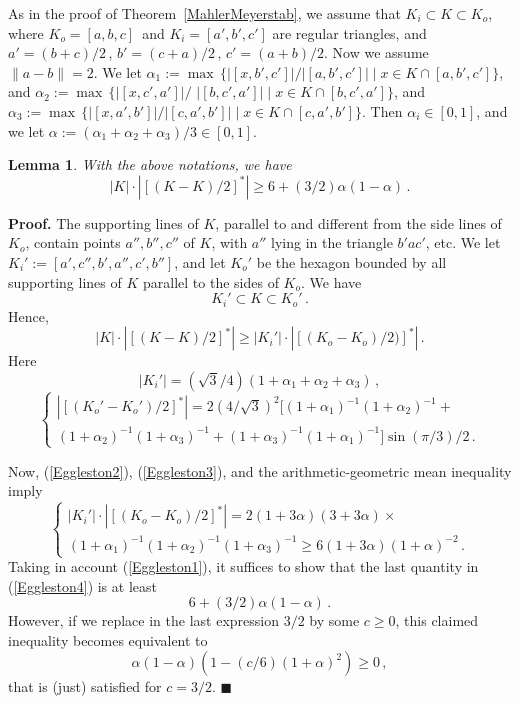 \documentclass[12pt]{article}
\newtheorem{Lem}[Thm]{Lemma}
\begin{document}
As in the proof of Theorem~\ref{MahlerMeyerstab}, we assume that $K_i \subset
K \subset K_o$, where $K_o=[a,b,c]\,$ and 
$K_i=[a',b',c']$ are regular triangles, and
$a'=(b+c)/2\,$, $b'=(c+a)/2\,$, $c'=(a+b)/2$. Now we assume $\| a-b \| =2$.
We let $\alpha _1:= \max \, \{ | [x,b',c']|/|[a,b',c'] | \mid x \in K \cap
[a,b',c'] \} $, and
$ \alpha _2:= \max \, \{ | [x,c',a']|/$
\newline
$|[b,c',a'] | \mid x \in K \cap
[b,c',a'] \} $, and
$\alpha _3:= \max \, \{ | [x,a',b']|/|[c,a',b'] | \mid x \in K \cap
[c,a',b'] \} $. 
Then $ \alpha _i \in [0,1]$, and we let $\alpha :=(\alpha _1+ \alpha _2+ \alpha
_3)/3 \in [0,1]$.


\begin{Lem}
\label{Egglestonlemma}
With the above notations, we have
$$
|K| \cdot | [ (K-K)/2 ] ^* | \ge 6 + (3/2) \alpha (1- \alpha ) \,.
$$
\end{Lem}

{\bf Proof.}
The supporting lines of
$K$, parallel to and different from the side lines of $K_o$, contain points
$a'',b'',c''$ of $K$, with $a''$ lying in the triangle $b'ac'$, etc.
We let $K_i':=[a',c'',b',a'',c',b'']$, and let
$K_o'$ be the hexagon bounded by all supporting lines of $K$ parallel to the
sides of $K_o$.
We have 
$$
K_i' \subset K \subset K_o'\,.
$$
Hence, 
\begin{equation}
\label{Eggleston1}
|K| \cdot | [(K-K)/2]^* | \ge | K_i'| \cdot | [(K_o-K_o)/2)]^* | \,. 
\end{equation}
Here 
\begin{equation}
\label{Eggleston2}
| K_i'|=({\sqrt{3}}/4) (1+ \alpha _1+ \alpha _2+ \alpha _3)\,, 
\end{equation}
\begin{equation}
\label{Eggleston3}
\begin{cases}
| [(K_o'-K_o')/2]^* | = 
2 ( 4/ \sqrt{3} ) ^2 [ (1+ \alpha _1)^{-1}(1+ \alpha _2)^{-1} + \\
(1+ \alpha _2)^{-1}(1+ \alpha _3)^{-1}+(1+\alpha _3)^{-1}(1+ \alpha _1)^{-1} 
] \sin (\pi /3)/2\,. 
\end{cases}
\end{equation}

Now, (\ref{Eggleston2}), (\ref{Eggleston3}), and 
the arithmetic-geometric mean inequality imply 
\begin{equation}
\label{Eggleston4}
\begin{cases}
| K_i'| \cdot | [(K_o-K_o)/2]^* | = 
2(1+3 \alpha )(3+3 \alpha ) \times \\
(1+ \alpha _1)^{-1}(1+\alpha _2)^{-1}(1+\alpha _3)^{-1} \ge 
6(1+3 \alpha )(1+ \alpha )^{-2} 
\,.
\end{cases} 
\end{equation}
Taking in account (\ref{Eggleston1}),
it suffices to show that the last quantity in (\ref{Eggleston4})
is at least 
$$
6+ (3/2) \alpha (1- \alpha )\,.
$$
However, if we replace in the last expression 
$3/2$ by some $c \ge 0$, this claimed inequality
becomes equivalent to
$$
\alpha (1-\alpha ) \left( 1-(c/6) (1+\alpha )^2 \right) \ge 0\,,
$$
that is (just) satisfied for $c=3/2$.
$ \blacksquare $
\end{document}
